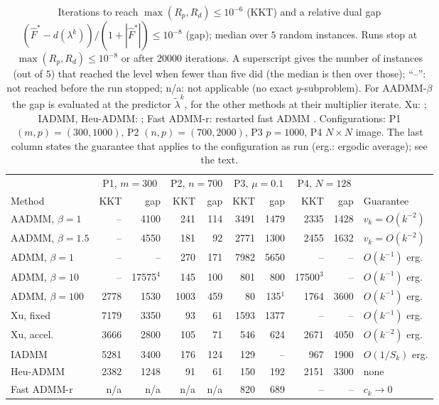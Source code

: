 \begin{table}[htbp]
\centering
\caption{Iterations to reach $\max(R_p,R_d)\le10^{-6}$ (KKT) and a relative dual gap $(\widehat F^{*}-d(\lambda^{k}))/(1+|\widehat F^{*}|)\le10^{-8}$ (gap); median over $5$ random instances. Runs stop at $\max(R_p,R_d)\le10^{-8}$ or after $20000$ iterations. A superscript gives the number of instances (out of $5$) that reached the level when fewer than five did (the median is then over those); ``--'': not reached before the run stopped; n/a: not applicable (no exact $y$-subproblem). For AADMM-$\beta$ the gap is evaluated at the predictor $\tilde\lambda^{k}$, for the other methods at their multiplier iterate. Xu: \cite{Xu-2017}; IADMM, Heu-ADMM: \cite{Tang-2024}; Fast ADMM-r: restarted fast ADMM \cite{Goldstein-2014}. Configurations: P1 $(m,p)=(300,1000)$, P2 $(n,p)=(700,2000)$, P3 $p=1000$, P4 $N\times N$ image. The last column states the guarantee that applies to the configuration as run (erg.: ergodic average); see the text.}\label{tab:c1-main}
\scriptsize\setlength{\tabcolsep}{2.6pt}
\begin{tabular}{lrrrrrrrrl}
\toprule
 & \multicolumn{2}{c}{P1, $m{=}300$} & \multicolumn{2}{c}{P2, $n{=}700$} & \multicolumn{2}{c}{P3, $\mu{=}0.1$} & \multicolumn{2}{c}{P4, $N{=}128$} & \\
\cmidrule(lr){2-3}\cmidrule(lr){4-5}\cmidrule(lr){6-7}\cmidrule(lr){8-9}
Method & KKT & gap & KKT & gap & KKT & gap & KKT & gap & Guarantee \\
\midrule
AADMM, $\beta{=}1$ & -- & 4100 & 241 & 114 & 3491 & 1479 & 2335 & 1428 & $v_k{=}O(k^{-2})$ \\
AADMM, $\beta{=}1.5$ & -- & 4550 & 181 & 92 & 2771 & 1300 & 2455 & 1632 & $v_k{=}O(k^{-2})$ \\
\addlinespace[2pt]
ADMM, $\beta{=}1$ & -- & -- & 270 & 171 & 7982 & 5650 & -- & -- & $O(k^{-1})$ erg. \\
ADMM, $\beta{=}10$ & -- & 17575$^{4}$ & 145 & 100 & 801 & 800 & 17500$^{3}$ & -- & $O(k^{-1})$ erg. \\
ADMM, $\beta{=}100$ & 2778 & 1530 & 1003 & 459 & 80 & 135$^{1}$ & 1764 & 3600 & $O(k^{-1})$ erg. \\
\addlinespace[2pt]
Xu, fixed & 7179 & 3350 & 93 & 61 & 1593 & 1377 & -- & -- & $O(k^{-1})$ erg. \\
Xu, accel. & 3666 & 2800 & 105 & 71 & 546 & 624 & 2671 & 4050 & $O(k^{-2})$ erg. \\
IADMM & 5281 & 3400 & 176 & 124 & 129 & -- & 967 & 1900 & $O(1/S_k)$ erg. \\
Heu-ADMM & 2382 & 1248 & 91 & 61 & 150 & 192 & 2151 & 3300 & none \\
Fast ADMM-r & n/a & n/a & n/a & n/a & 820 & 689 & -- & -- & $c_k\to0$ \\
\bottomrule
\end{tabular}
\end{table}
